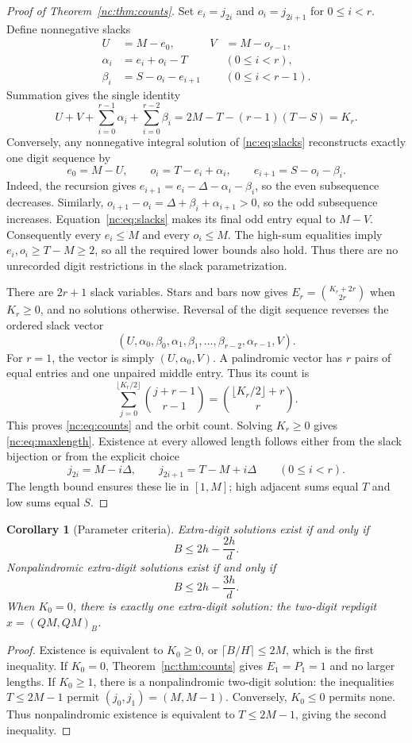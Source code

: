 \documentclass[11pt]{amsart}
\newtheorem{corollary}[theorem]{Corollary}
\theoremstyle{remark}\newtheorem{remark}[theorem]{Remark}
\begin{document}
\begin{proof}[Proof of Theorem~\ref{nc:thm:counts}]
Set $e_i=j_{2i}$ and $o_i=j_{2i+1}$ for $0\le i<r$. Define nonnegative slacks
\begin{align*}
 U&=M-e_0,& V&=M-o_{r-1},\\
 \alpha_i&=e_i+o_i-T&&(0\le i<r),\\
 \beta_i&=S-o_i-e_{i+1}&&(0\le i<r-1).
\end{align*}
Summation gives the single identity
\begin{equation}\label{nc:eq:slacks}
 U+V+\sum_{i=0}^{r-1}\alpha_i+\sum_{i=0}^{r-2}\beta_i
 =2M-T-(r-1)(T-S)=K_r.
\end{equation}
Conversely, any nonnegative integral solution of \eqref{nc:eq:slacks} reconstructs exactly one digit sequence by
\[
 e_0=M-U,\qquad o_i=T-e_i+\alpha_i,\qquad
 e_{i+1}=S-o_i-\beta_i.
\]
Indeed, the recursion gives $e_{i+1}=e_i-\Delta-\alpha_i-\beta_i$, so the even subsequence decreases. Similarly, $o_{i+1}-o_i=\Delta+\beta_i+\alpha_{i+1}>0$, so the odd subsequence increases. Equation~\eqref{nc:eq:slacks} makes its final odd entry equal to $M-V$. Consequently every $e_i\le M$ and every $o_i\le M$. The high-sum equalities imply $e_i,o_i\ge T-M\ge2$, so all the required lower bounds also hold. Thus there are no unrecorded digit restrictions in the slack parametrization.

There are $2r+1$ slack variables. Stars and bars now gives $E_r=\binom{K_r+2r}{2r}$ when $K_r\ge0$, and no solutions otherwise. Reversal of the digit sequence reverses the ordered slack vector
\[
 (U,\alpha_0,\beta_0,\alpha_1,\beta_1,\ldots,
      \beta_{r-2},\alpha_{r-1},V).
\]
For $r=1$, the vector is simply $(U,\alpha_0,V)$. A palindromic vector has $r$ pairs of equal entries and one unpaired middle entry. Thus its count is
\[
 \sum_{j=0}^{\lfloor K_r/2\rfloor}\binom{j+r-1}{r-1}
 =\binom{\lfloor K_r/2\rfloor+r}{r}.
\]
This proves \eqref{nc:eq:counts} and the orbit count. Solving $K_r\ge0$ gives \eqref{nc:eq:maxlength}. Existence at every allowed length follows either from the slack bijection or from the explicit choice
\[
 j_{2i}=M-i\Delta,\qquad j_{2i+1}=T-M+i\Delta
 \qquad(0\le i<r).
\]
The length bound ensures these lie in $[1,M]$; high adjacent sums equal $T$ and low sums equal $S$.
\end{proof}

\begin{corollary}[Parameter criteria]\label{nc:cor:existence}
Extra-digit solutions exist if and only if
\[
 B\le2h-\frac{2h}{d}.
\]
Nonpalindromic extra-digit solutions exist if and only if
\[
 B\le2h-\frac{3h}{d}.
\]
When $K_0=0$, there is exactly one extra-digit solution: the two-digit repdigit $x=(QM,QM)_B$.
\end{corollary}
\begin{proof}
Existence is equivalent to $K_0\ge0$, or $\lceil B/H\rceil\le2M$, which is the first inequality. If $K_0=0$, Theorem~\ref{nc:thm:counts} gives $E_1=P_1=1$ and no larger lengths. If $K_0\ge1$, there is a nonpalindromic two-digit solution: the inequalities $T\le2M-1$ permit $(j_0,j_1)=(M,M-1)$. Conversely, $K_0\le0$ permits none. Thus nonpalindromic existence is equivalent to $T\le2M-1$, giving the second inequality.
\end{proof}
\end{document}
